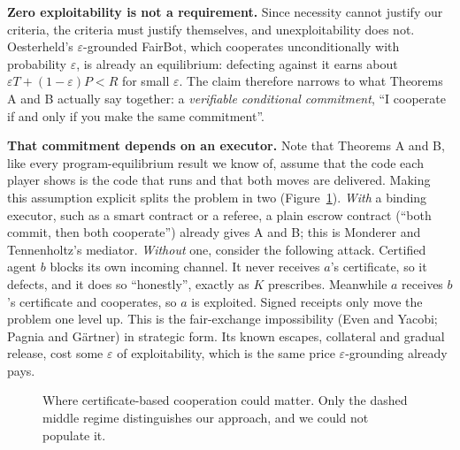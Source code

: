 \documentclass[11pt]{article}
\begin{document}
\textbf{Zero exploitability is not a requirement.} Since necessity cannot justify our criteria, the criteria must justify themselves, and unexploitability does not. Oesterheld's $\varepsilon$-grounded FairBot, which cooperates unconditionally with probability $\varepsilon$, is already an equilibrium: defecting against it earns about $\varepsilon T + (1-\varepsilon)P < R$ for small $\varepsilon$. The claim therefore narrows to what Theorems A and B actually say together: a \emph{verifiable conditional commitment}, ``I cooperate if and only if you make the same commitment''.

\textbf{That commitment depends on an executor.} Note that Theorems A and B, like every program-equilibrium result we know of, assume that the code each player shows is the code that runs and that both moves are delivered. Making this assumption explicit splits the problem in two (Figure~\ref{fig:executor}). \emph{With} a binding executor, such as a smart contract or a referee, a plain escrow contract (``both commit, then both cooperate'') already gives A and B; this is Monderer and Tennenholtz's mediator. \emph{Without} one, consider the following attack. Certified agent $b$ blocks its own incoming channel. It never receives $a$'s certificate, so it defects, and it does so ``honestly'', exactly as $K$ prescribes. Meanwhile $a$ receives $b$'s certificate and cooperates, so $a$ is exploited. Signed receipts only move the problem one level up. This is the fair-exchange impossibility (Even and Yacobi; Pagnia and Gärtner) in strategic form. Its known escapes, collateral and gradual release, cost some $\varepsilon$ of exploitability, which is the same price $\varepsilon$-grounding already pays.

\begin{figure}[h]
\centering
{}
\caption{Where certificate-based cooperation could matter. Only the dashed middle regime distinguishes our approach, and we could not populate it.}
\label{fig:executor}
\end{figure}
\end{document}
